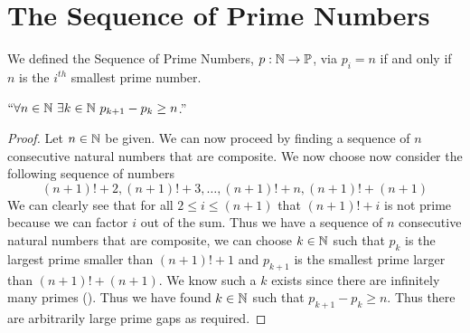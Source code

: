     \section{The Sequence of Prime Numbers}
        \begin{definition}
            We defined the Sequence of Prime Numbers, $p: \mathbb{N} \rightarrow \mathbb{P}$, via
            $p_i = n$ if and only if $n$ is the $i^{th}$ smallest prime number.
        \end{definition}
        \begin{theorem}
            $``\forall n \in \mathbb{N} \ \exists k \in \mathbb{N} \ p_{k + 1} - p_{k} \ge n$.''
        \end{theorem}
        \begin{proof}
            Let $n \in \mathbb{N}$ be given. We can now proceed by finding a sequence of $n$ consecutive
            natural numbers that are composite. We now choose now consider the following sequence of
            numbers
            \[
                (n + 1)! + 2, (n + 1)! + 3, \dots, (n + 1)! + n, (n + 1)! + (n + 1)
            \]
            We can clearly see that for all $2 \le i \le (n + 1)$ that $(n + 1)! + i$
            is not prime because we can factor $i$ out of the sum. Thus we have a sequence of $n$
            consecutive natural numbers that are composite, we can choose $k \in \mathbb{N}$ such
            that $p_k$ is the largest prime smaller than $(n + 1)! + 1$ and $p_{k + 1}$ is the
            smallest prime larger than $(n + 1)! + (n + 1)$. We know such a $k$ exists since there
            are infinitely many primes (). Thus we have found
            $k \in \mathbb{N}$ such that $p_{k + 1} - p_k \ge n$. Thus there are arbitrarily large
            prime gaps as required. \QED
        \end{proof}
